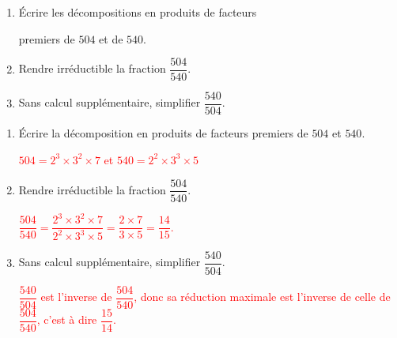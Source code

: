 \begin{exercice*}    
    \begin{enumerate}
        \item Écrire les décompositions en produits de facteurs 
        
        premiers de $504$ et de $540$.
        \item Rendre irréductible la fraction $\dfrac{504}{540}$.
        \item Sans calcul supplémentaire, simplifier $\dfrac{540}{504}$.        
    \end{enumerate}    
\end{exercice*}
\begin{corrige}
    \begin{enumerate}
        \item Écrire la décomposition en produits de facteurs premiers de $504$ et $540$.
        
        \textcolor{red}{
            $504 = 2^3\times 3^2\times 7$ et $540 = 2^2\times 3^3\times 5$
        }
        \item Rendre irréductible la fraction $\dfrac{504}{540}$.
        
        \textcolor{red}{
            $\dfrac{504}{540} = \dfrac{2^3\times 3^2\times 7}{2^2\times 3^3\times 5} = \dfrac{2\times 7}{3\times 5} = \dfrac{14}{15}$.
        }
        \item Sans calcul supplémentaire, simplifier $\dfrac{540}{504}$.        
        
        \textcolor{red}{
            $\dfrac{540}{504}$ est l'inverse de $\dfrac{504}{540}$, donc sa réduction maximale est l'inverse de celle de $\dfrac{504}{540}$, c'est à dire $\dfrac{15}{14}$.
        }
    \end{enumerate}
\end{corrige}

